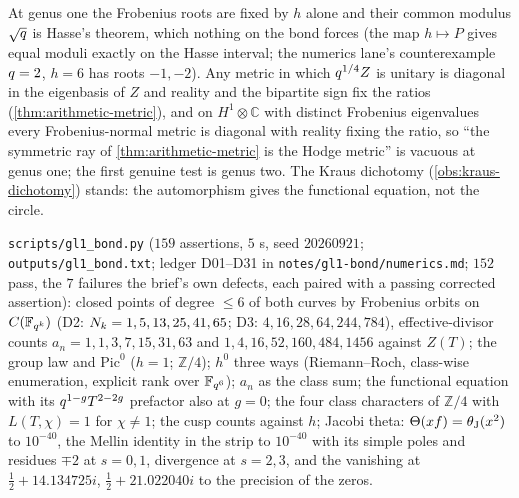 \begin{observation}
\label{obs:gl1-bond-no-metric}
At genus one the Frobenius roots are fixed by $h$ alone and their common modulus $\sqrt{q}$ is Hasse's theorem,
which nothing on the bond forces (the map $h\mapsto P$ gives equal moduli exactly on the Hasse interval; the numerics
lane's counterexample $q = 2$, $h = 6$ has roots $-1,-2$). Any metric in which $q^{1/4}Z$ is unitary is diagonal in the eigenbasis of $Z$ and reality and the bipartite
sign fix the ratios (\cref{thm:arithmetic-metric}), and on $H^1\otimes\mathbb C$ with distinct Frobenius eigenvalues
every Frobenius-normal metric is diagonal with reality fixing the ratio, so ``the symmetric ray of \cref{thm:arithmetic-metric}
is the Hodge metric'' is vacuous at genus one; the first genuine test is genus two. The Kraus dichotomy
(\cref{obs:kraus-dichotomy}) stands: the automorphism gives the functional equation, not the circle.
\end{observation}

\begin{numerical}
\label{num:gl1-bond}
\texttt{scripts/gl1\_bond.py} ($159$ assertions, $5$ s, seed $20260921$; \texttt{outputs/gl1\_bond.txt}; ledger D01--D31 in
\texttt{notes/gl1-bond/numerics.md}; $152$ pass, the $7$ failures the brief's own defects, each paired with a passing
corrected assertion): closed points of degree $\le6$ of both curves by Frobenius orbits on $C(\mathbb F_{q^{k}})$ (D2:
$N_{k} = 1,5,13,25,41,65$; D3: $4,16,28,64,244,784$), effective-divisor counts $a_n = 1,1,3,7,15,31,63$ and
$1,4,16,52,160,484,1456$ against $Z(T)$; the group law and $\mathrm{Pic}^0$ ($h = 1$; $\mathbb Z/4$); $h^0$ three ways
(Riemann--Roch, class-wise enumeration, explicit rank over $\mathbb F_{q^{6}}$); $a_n$ as the class sum; the functional
equation with its $q^{1-g}T^{2-2g}$ prefactor also at $g = 0$; the four class characters of $\mathbb Z/4$ with
$L(T,\chi) = 1$ for $\chi\ne1$; the cusp counts against $h$; Jacobi theta: $\Theta(xf) = \theta_{\mathrm J}(x^2)$ to $10^{-40}$, the
Mellin identity in the strip to $10^{-40}$ with its simple poles and residues $\mp2$ at $s = 0, 1$, divergence at
$s = 2, 3$, and the vanishing at $\tfrac12+14.134725i$, $\tfrac12+21.022040i$ to the precision of the zeros.
\end{numerical}


